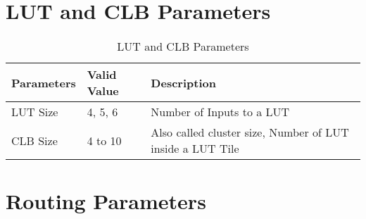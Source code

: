 \section{LUT and CLB Parameters}
\label{sec:lut_and_clb_param}

\begin{table}[htp]
		\begin{center}
				{\footnotesize
				{\tabulinesep=1.2mm
				\begin{tabu}{ | p{1.0in} | p{1.5in} | p{2.5in} |}    \hline
				Parameters & Valid Value & Description \\ \hline\hline
				
				LUT Size & 4, 5, 6 & Number of Inputs to a LUT \\ \hline
				
				CLB Size & 4 to 10 & Also called cluster size, Number of LUT inside a LUT Tile \\ \hline

				\end{tabu}}}
				\caption{LUT and CLB Parameters
				\label{table:lut_clb_params}}
		\end{center}
\end{table}

\vspace{-1cm}

\section{Routing Parameters}
\label{sec:routing_param}

